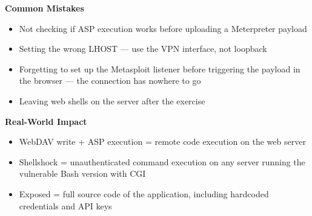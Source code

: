 \begin{notebox}
\begin{takebox}
\textbf{Common Mistakes}
\begin{itemize}
  \item Not checking if ASP execution works before uploading a Meterpreter payload
  \item Setting the wrong LHOST --- use the VPN interface, not loopback
  \item Forgetting to set up the Metasploit listener before triggering the payload
        in the browser --- the connection has nowhere to go
  \item Leaving web shells on the server after the exercise
\end{itemize}

\textbf{Real-World Impact}
\begin{itemize}
  \item WebDAV write + ASP execution = remote code execution on the web server
  \item Shellshock = unauthenticated command execution on any server running the
        vulnerable Bash version with CGI
  \item Exposed  = full source code of the application, including
        hardcoded credentials and API keys
\end{itemize}
\end{takebox}

\end{notebox}